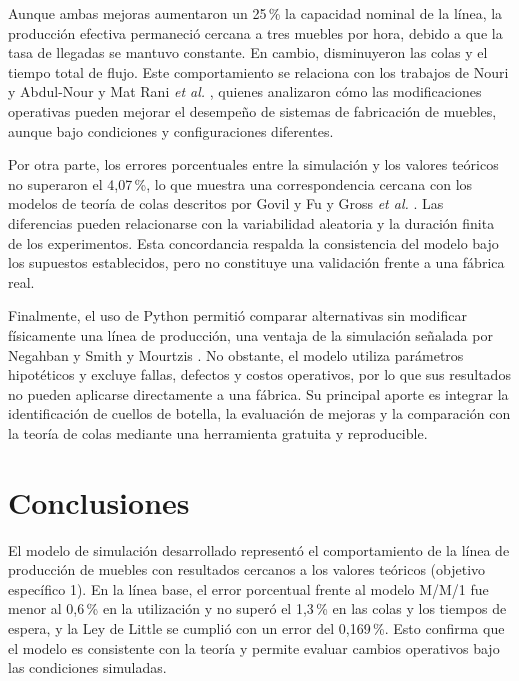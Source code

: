 \documentclass[conference,a4paper]{IEEEtran}
\begin{document}
Aunque ambas mejoras aumentaron un 25\,\% la capacidad nominal de la línea, la producción
efectiva permaneció cercana a tres muebles por hora, debido a que la tasa de llegadas se
mantuvo constante. En cambio, disminuyeron las colas y el tiempo total de flujo. Este
comportamiento se relaciona con los trabajos de Nouri y Abdul-Nour \cite{nouri2019} y Mat
Rani \textit{et al.} \cite{matrani2026}, quienes analizaron cómo las modificaciones operativas
pueden mejorar el desempeño de sistemas de fabricación de muebles, aunque bajo condiciones y
configuraciones diferentes.

Por otra parte, los errores porcentuales entre la simulación y los valores teóricos no
superaron el 4,07\,\%, lo que muestra una correspondencia cercana con los modelos de teoría de
colas descritos por Govil y Fu \cite{govil1999} y Gross \textit{et al.} \cite{gross2008}. Las
diferencias pueden relacionarse con la variabilidad aleatoria y la duración finita de los
experimentos. Esta concordancia respalda la consistencia del modelo bajo los supuestos
establecidos, pero no constituye una validación frente a una fábrica real.

Finalmente, el uso de Python permitió comparar alternativas sin modificar físicamente una
línea de producción, una ventaja de la simulación señalada por Negahban y Smith
\cite{negahban2014} y Mourtzis \cite{mourtzis2020}. No obstante, el modelo utiliza parámetros
hipotéticos y excluye fallas, defectos y costos operativos, por lo que sus resultados no
pueden aplicarse directamente a una fábrica. Su principal aporte es integrar la
identificación de cuellos de botella, la evaluación de mejoras y la comparación con la teoría
de colas mediante una herramienta gratuita y reproducible.

\section{Conclusiones}
El modelo de simulación desarrollado representó el comportamiento de la línea de producción
de muebles con resultados cercanos a los valores teóricos (objetivo específico 1). En la
línea base, el error porcentual frente al modelo M/M/1 fue menor al 0,6\,\% en la utilización
y no superó el 1,3\,\% en las colas y los tiempos de espera, y la Ley de Little se cumplió
con un error del 0,169\,\%. Esto confirma que el modelo es consistente con la teoría y
permite evaluar cambios operativos bajo las condiciones simuladas.
\end{document}
